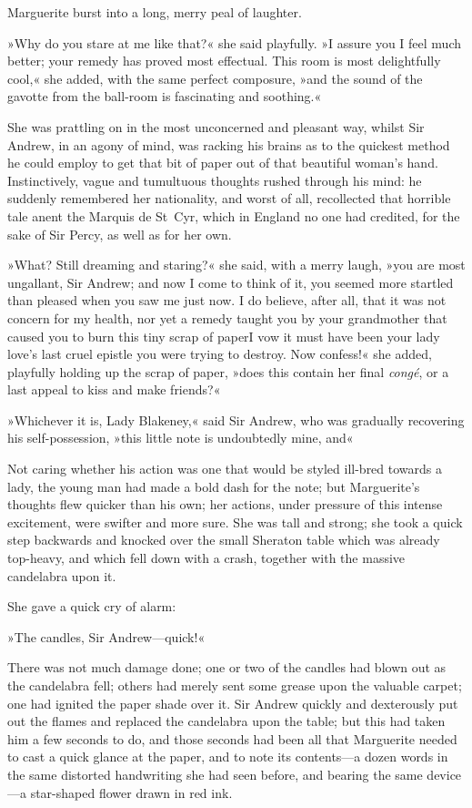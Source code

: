 Marguerite burst into a long, merry peal of laughter.

»Why do you stare at me like that?« she said playfully. »I assure you I feel much better; your remedy has proved most effectual. This room is most delightfully cool,« she added, with the same perfect composure, »and the sound of the gavotte from the ball-room is fascinating and soothing.«

She was prattling on in the most unconcerned and pleasant way, whilst Sir Andrew, in an agony of mind, was racking his brains as to the quickest method he could employ to get that bit of paper out of that beautiful woman's hand. Instinctively, vague and tumultuous thoughts  rushed through his mind: he suddenly remembered her nationality, and worst of all, recollected that horrible tale anent the Marquis de St~Cyr, which in England no one had credited, for the sake of Sir Percy, as well as for her own.

»What? Still dreaming and staring?« she said, with a merry laugh, »you are most ungallant, Sir Andrew; and now I come to think of it, you seemed more startled than pleased when you saw me just now. I do believe, after all, that it was not concern for my health, nor yet a remedy taught you by your grandmother that caused you to burn this tiny scrap of paper\textellipsis \allowbreak  I vow it must have been your lady love's last cruel epistle you were trying to destroy. Now confess!« she added, playfully holding up the scrap of paper, »does this contain her final \textit{congé}, or a last appeal to kiss and make friends?«

»Whichever it is, Lady Blakeney,« said Sir Andrew, who was gradually recovering his self-possession, »this little note is un\-doubt\-ed\-ly mine, and\textellipsis«

Not caring whether his action was one that would be styled ill-bred towards a lady, the young man had made a bold dash for the note; but Marguerite's thoughts flew quicker than his own; her actions, under pressure of this intense excitement, were swifter and more sure. She was tall and strong; she took a quick step backwards and knocked over the small Sheraton table which was already top-heavy, and which fell down with a crash, together with the massive candelabra upon it.

She gave a quick cry of alarm:

»The candles, Sir Andrew—quick!«

There was not much damage done; one or two of the candles had blown out as the candelabra fell; others had merely sent some grease upon the valuable carpet; one had ignited the paper shade over it. Sir Andrew quickly and dexterously put out the flames and replaced the candelabra upon the table; but this had taken him a few seconds to do, and those seconds had been all that Marguerite needed to cast a quick glance at the paper, and to note its contents—a dozen words in the same distorted handwriting she had seen before, and bearing the same device—a star-shaped flower drawn in red ink.

